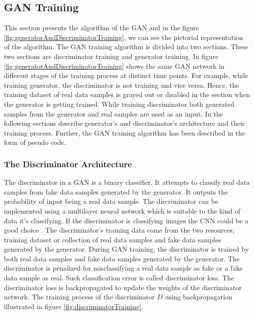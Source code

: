 \newpage

\subsection{\ac{GAN} Training}

This section presents the algorithm of the \ac{GAN} and in the figure \ref{fig:generatorAndDiscriminatorTraining}, we can see the pictorial representation of the algorithm. The GAN training algorithm is divided into two sections. These two sections are discriminator training and generator training. In figure \ref{fig:generatorAndDiscriminatorTraining} shows the same GAN network in different stages of the training process at distinct time points. For example, while training generator, the discriminator is not training and vice versa. Hence, the training dataset of real data samples is grayed out or disabled in the section when the generator is getting trained. While training discriminator both generated samples from the generator and real samples are used as an input. In the following sections describe generator's and discriminator's architecture and their training process. Further, the \ac{GAN} training algorithm has been described in the form of pseudo code.

\subsubsection{The Discriminator Architecture}\label{TheDiscriminatorSubSection}

The discriminator in a \ac{GAN} is a binary classifier. It attempts to classify real data samples from fake data samples generated by the generator. It outputs the probability of input being a real data sample. The discriminator can be implemented using a multilayer neural network which is suitable to the kind of data it's classifying. If the discriminator is classifying images the \ac{CNN} could be a good choice \cite{radford2016unsupervised}. The discriminator's training data come from the two resources, training dataset or collection of real data samples and fake data samples generated by the generator. During \ac{GAN} training, the discriminator is trained by both real data samples and fake data samples generated by the generator. The discriminator is penalized for misclassifying a real data sample as fake or a fake data sample as real. Such classification error is called discriminator loss. The discriminator loss is backpropagated to update the weights of the discriminator network. The training process of the discriminator $D$ using backpropagation illustrated in figure \ref{fig:discriminatorTraining}.


